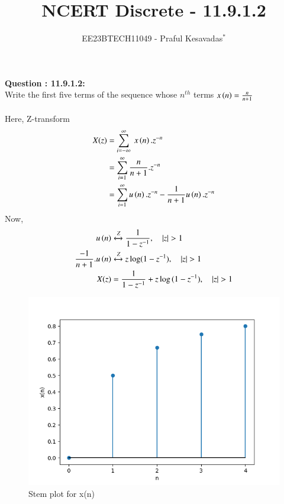 \documentclass[journal,12pt,twocolumn]{IEEEtran}
\theoremstyle{remark}
\begin{document}

\vspace{3cm}

\title{NCERT Discrete - 11.9.1.2}
\author{EE23BTECH11049 - Praful Kesavadas$^{*}$%
}
\maketitle
\newpage
\bigskip

\renewcommand{\thefigure}{\theenumi}
\renewcommand{\thetable}{\theenumi}

\vspace{3cm}
\textbf{Question : 11.9.1.2:}\\
Write the first five terms of the sequence whose $n^{th}$ terms  $x\left(n\right) = \frac{n}{n+1}$\\
\solution\\

\vspace{1cm}
Here, Z-transform
\begin{align}
X(z) &= \sum_{i=-\infty}^\infty\ x\left(n\right).z^{-n}\\
&= \sum_{i=1}^\infty \frac{n}{n+1} . z^{-n}\\
&= \sum_{i=1}^\infty u\left(n\right).z^{-n} - \frac{1}{n+1} u\left(n\right).z^{-n}
\end{align}
Now, 
\begin{align}
u\brak{n} &\xleftrightarrow Z  \frac{1}{1-z^{-1}}, \quad{|z|>1}\\
\frac{-1}{n+1}.u\brak{n} &\xleftrightarrow Z  z\log(1-z^{-1}), \quad{|z|>1}\\
X(z) &= \frac{1}{1-z^{-1}} + z\log{(1-z^{-1})} ,\quad{|z|>1}
\end{align}
\begin{figure}[ht]
    \centering
    \includegraphics[width=\columnwidth]{figs/graph1.png}
    \caption{Stem plot for x(n)}
    \label{fig:11.9.1.2fig1}
\end{figure}
\end{document}
